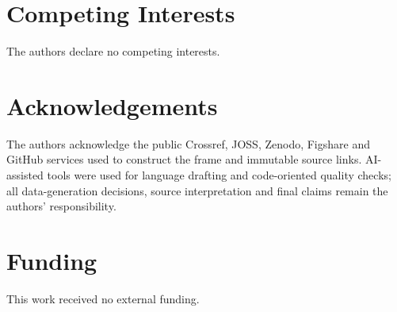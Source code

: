 \documentclass[10pt,a4paper]{article}
\begin{document}
\section*{Competing Interests}

The authors declare no competing interests.

\section*{Acknowledgements}

The authors acknowledge the public Crossref, JOSS, Zenodo, Figshare and GitHub services used to construct the frame and immutable source links. AI-assisted tools were used for language drafting and code-oriented quality checks; all data-generation decisions, source interpretation and final claims remain the authors' responsibility.

\section*{Funding}

This work received no external funding.
\end{document}
